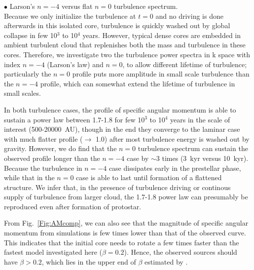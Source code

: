 \noindent $\bullet$ Larson's $n=-4$ versus flat $n=0$ turbulence spectrum.\\
Because we only initialize the turbulence at $t=0$ and no driving
is done afterwards in this isolated core, turbulence is quickly
washed out by global collapse in few 10$^3$ to 10$^4$ years. However, typical
dense cores are embedded in ambient turbulent cloud that replenishes
both the mass and turbulence in these cores.
Therefore, we investigate two the turbulence power spectra in k space
with index $n=-4$ (Larson's law) and $n=0$, to allow different lifetime
of turbulence; particularly the $n=0$ profile puts more amplitude in
small scale turbulence than the $n=-4$ profile, which can somewhat
extend the lifetime of turbulence in small scales.

In both turbulence cases, the profile of specific angular momentum
is able to sustain a power law between 1.7-1.8 for few 10$^3$ to 10$^4$ years
in the scale of interest (500-20000~AU), though in the end they
converge to the laminar case with much flatter profile ($\rightarrow$ 1.0)
after most turbulence energy is washed out by gravity.
However, we do find that the $n=0$ turbulence spectrum can sustain the
observed profile longer than the $n=-4$ case by $\sim$3 times
(3~kyr versus 10~kyr). Because the turbulence in $n=-4$ case dissipates
early in the prestellar phase, while that in the $n=0$ case is
able to last until formation of a flattened structure.
We infer that, in the presence of turbulence driving or continous supply
of turbulence from larger cloud, the 1.7-1.8 power law can presumably be
reproduced even after formation of protostar.

From Fig.~\ref{Fig:AMcomp}, we can also see that the magnitude of
specific angular momentum from simulations is few times lower than
that of the observed curve. This indicates that the initial core needs
to rotate a few times faster than the fastest model investigated here
($\beta=0.2$). Hence, the observed sources should have $\beta>0.2$, which
lies in the upper end of $\beta$ estimated by \citep{Goodman+1993}.


  

  
  